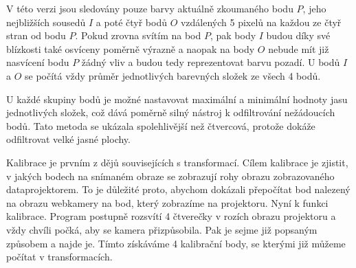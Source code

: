 \documentclass[twoside,12pt]{article}
\begin{document}
V této verzi jsou sledovány pouze barvy aktuálně zkoumaného bodu $P$, jeho nejbližších sousedů $I$ a poté čtyř bodů $O$ vzdálených 5 pixelů na každou ze čtyř stran od bodu $P$. Pokud zrovna svítím na bod $P$, pak body $I$ budou díky své blízkosti také osvíceny poměrně výrazně a naopak na body $O$ nebude mít již nasvícení bodu $P$ žádný vliv a budou tedy reprezentovat barvu pozadí. U bodů $I$ a $O$ se počítá vždy průměr jednotlivých barevných složek ze všech 4 bodů. 

U každé skupiny bodů je možné nastavovat maximální a minimální hodnoty jasu jednotlivých složek, což dává poměrně silný nástroj k odfiltrování nežádoucích bodů. Tato metoda se ukázala spolehlivější než čtvercová, protože dokáže odfiltrovat velké jasné plochy.

Kalibrace je prvním z dějů souvisejících s transformací. Cílem kalibrace je zjistit, v jakých bodech na snímaném obraze se zobrazují rohy obrazu zobrazovaného dataprojektorem. To je důležité proto, abychom dokázali přepočítat bod nalezený na obrazu webkamery na bod, který zobrazíme na projektoru. Nyní k funkci kalibrace. Program postupně rozsvítí 4 čtverečky v rozích obrazu projektoru a vždy chvíli počká, aby se kamera přizpůsobila. Pak je sejme již popsaným způsobem a najde je. Tímto získáváme 4 kalibrační body, se kterými již můžeme počítat v transformacích.
\end{document}
